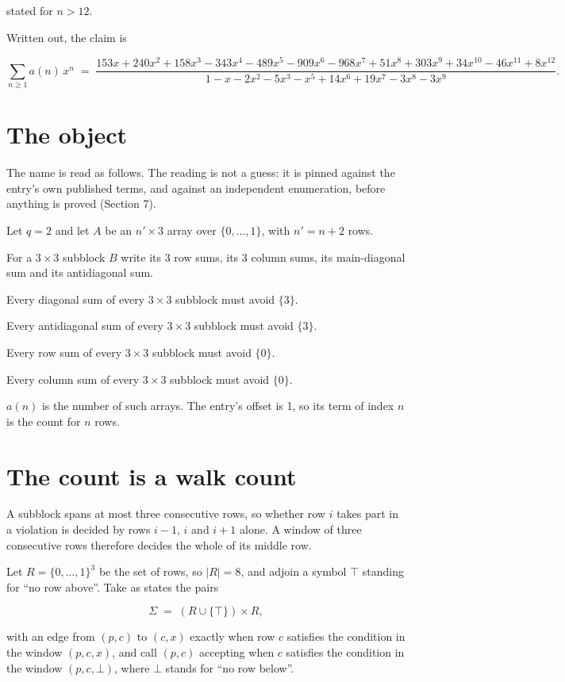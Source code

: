 \documentclass[11pt]{article}
\theoremstyle{definition}
\begin{document}
stated for $n > 12$.

Written out, the claim is

\[\sum_{n \ge 1} a(n)\,x^n \;=\; \frac{153x + 240x^{2} + 158x^{3} - 343x^{4} - 489x^{5} - 909x^{6} - 968x^{7} + 51x^{8} + 303x^{9} + 34x^{10} - 46x^{11} + 8x^{12}}{1 - x - 2x^{2} - 5x^{3} - x^{5} + 14x^{6} + 19x^{7} - 3x^{8} - 3x^{9}}.\]

\section{The object}

The name is read as follows. The reading is not a guess: it is pinned against the entry's own published terms, and against an independent enumeration, before anything is proved (Section 7).

Let $q = 2$ and let $A$ be an $n' \times 3$ array over $\{0,\dots,1\}$, with $n' = n + 2$ rows.

For a $3\times3$ subblock $B$ write its 3 row sums, its 3 column sums, its main-diagonal sum and its antidiagonal sum.

Every diagonal sum of every $3\times3$ subblock must avoid $\{3\}$.

Every antidiagonal sum of every $3\times3$ subblock must avoid $\{3\}$.

Every row sum of every $3\times3$ subblock must avoid $\{0\}$.

Every column sum of every $3\times3$ subblock must avoid $\{0\}$.

$a(n)$ is the number of such arrays. The entry's offset is 1, so its term of index $n$ is the count for $n$ rows.

\section{The count is a walk count}

A subblock spans at most three consecutive rows, so whether row $i$ takes part in a violation is decided by rows $i-1$, $i$ and $i+1$ alone. A window of three consecutive rows therefore decides the whole of its middle row.

Let $R = \{0,\dots,1\}^{3}$ be the set of rows, so $|R| = 8$, and adjoin a symbol $\top$ standing for ``no row above''. Take as states the pairs

\[\Sigma \;=\; (R \cup \{\top\}) \times R,\]

with an edge from $(p,c)$ to $(c,x)$ exactly when row $c$ satisfies the condition in the window $(p,c,x)$, and call $(p,c)$ accepting when $c$ satisfies the condition in the window $(p,c,\bot)$, where $\bot$ stands for ``no row below''.
\end{document}
